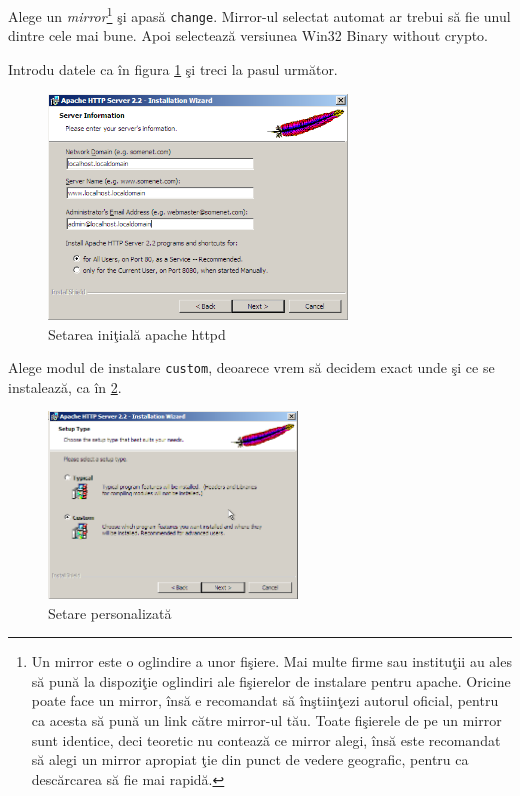 Alege un \textsl{mirror}\footnote{
Un mirror este o oglindire a unor fişiere. Mai multe firme sau instituţii au ales
să pună la dispoziţie oglindiri ale fişierelor de instalare pentru apache. Oricine
poate face un mirror, însă e recomandat să înştiinţezi autorul oficial, pentru
ca acesta să pună un link către mirror-ul tău. Toate fişierele de pe un mirror sunt identice,
deci teoretic nu contează ce mirror alegi, însă este recomandat să alegi un mirror
apropiat ţie din punct de vedere geografic, pentru ca descărcarea să fie mai
rapidă.} şi apasă \texttt{change}. Mirror-ul selectat automat ar trebui să fie unul
dintre cele mai bune. Apoi selectează versiunea {\glqq}Win32 Binary without crypto{\grqq}.


Introdu datele ca în figura \ref{fig:httpd setup} şi treci la pasul următor.

\begin{figure}[ht!]
  \centering
    \includegraphics[width=300px]{cap01/Screenshot-2.png}
  \caption{Setarea iniţială apache httpd}
  \label{fig:httpd setup}
\end{figure}

Alege modul de instalare \texttt{custom}, deoarece vrem să decidem exact unde şi ce
se instalează, ca în \ref{fig:httpd check custom setup}.

\begin{figure}[ht!]
  \centering
    \includegraphics[width=250px]{cap01/Screenshot-3.png}
  \caption{Setare personalizată}
  \label{fig:httpd check custom setup}
\end{figure}

